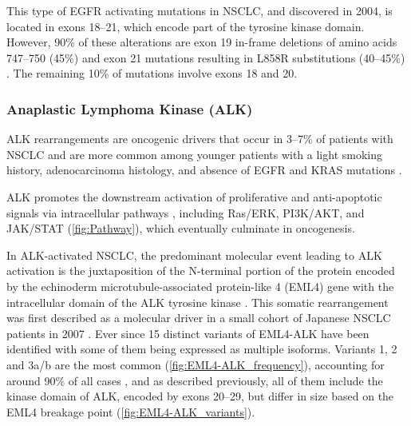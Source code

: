 This type of EGFR activating mutations in NSCLC, and discovered in 2004, is located in exons 18–21, which encode part of the tyrosine kinase domain. However, 90\% of these alterations are exon 19 in-frame deletions of amino acids 747–750 (45\%) and exon 21 mutations resulting in L858R substitutions (40–45\%) \cite{EGFR}. The remaining 10\% of mutations involve exons 18 and 20.

\subsubsection{Anaplastic Lymphoma Kinase (ALK)} \label{sec:ALK}

ALK rearrangements are oncogenic drivers that occur in 3–7\% of patients with NSCLC and are more common among younger patients with a light smoking history, adenocarcinoma histology, and absence of EGFR and KRAS mutations \cite{NSCLC_drivers, AD_drivers}.

ALK promotes the downstream activation of proliferative and anti-apoptotic signals via intracellular pathways \cite{ALK_fusions, EML4_ALK}, including Ras\slash ERK, PI3K\slash AKT, and JAK\slash STAT (\autoref{fig:Pathway}), which eventually culminate in oncogenesis.

In ALK-activated NSCLC, the predominant molecular event leading to ALK activation is the juxtaposition of the N-terminal portion of the protein encoded by the echinoderm microtubule-associated protein-like 4 (EML4) gene with the intracellular domain of the ALK tyrosine kinase \cite{ALK_identification}. This somatic rearrangement was first described as a molecular driver in a small cohort of Japanese NSCLC patients in 2007 \cite{ALK_identification}. Ever since 15 distinct variants of EML4-ALK have been identified with some of them being expressed as multiple isoforms. Variants 1, 2 and 3a\slash b are the most common  (\autoref{fig:EML4-ALK_frequency}), accounting for around 90\% of all cases \cite{EML4_ALK_variants}, and as described previously, all of them include the kinase domain of ALK, encoded by exons 20–29, but differ in size based on the EML4 breakage point  (\autoref{fig:EML4-ALK_variants}).


